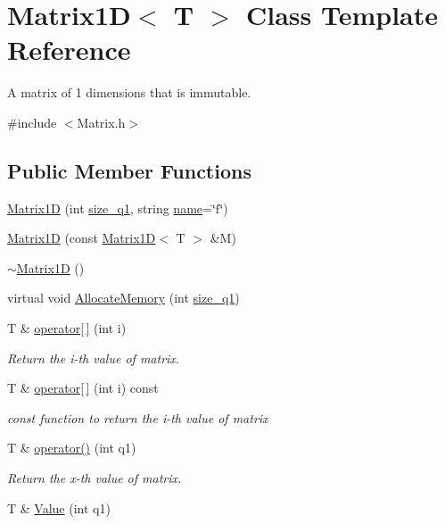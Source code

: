 \hypertarget{class_matrix1_d}{}\section{Matrix1\+D$<$ T $>$ Class Template Reference}
\label{class_matrix1_d}


A matrix of 1 dimensions that is immutable.  




{\ttfamily \#include $<$Matrix.\+h$>$}

\subsection*{Public Member Functions}
\begin{DoxyCompactItemize}
\item 
\hyperlink{class_matrix1_d_ad102d9262ea64711487a931477b166eb}{Matrix1\+D} (int \hyperlink{class_matrix1_d_a570f4a6b7df1811f2c3029ce026a6223}{size\+\_\+q1}, string \hyperlink{class_matrix1_d_a1a5290c958b4bdc9ae76e57c1c7048c2}{name}=\char`\"{}f\char`\"{})
\item 
\hyperlink{class_matrix1_d_a52a3b5b705f0b8bd66c7453436d39903}{Matrix1\+D} (const \hyperlink{class_matrix1_d}{Matrix1\+D}$<$ T $>$ \&M)
\item 
\hyperlink{class_matrix1_d_a7b9b926c9a367272c2815db41489a938}{$\sim$\+Matrix1\+D} ()
\item 
virtual void \hyperlink{class_matrix1_d_a4858f805f2eba8691fc1b2e929f61d3d}{Allocate\+Memory} (int \hyperlink{class_matrix1_d_a570f4a6b7df1811f2c3029ce026a6223}{size\+\_\+q1})
\item 
T \& \hyperlink{class_matrix1_d_ab750d3cce30397703938d1e8a3a40d5e}{operator\mbox{[}$\,$\mbox{]}} (int i)
\begin{DoxyCompactList}\small\item\em Return the i-\/th value of matrix. \end{DoxyCompactList}\item 
T \& \hyperlink{class_matrix1_d_adb3fb9a6de487ad9ede64c57c9612d5e}{operator\mbox{[}$\,$\mbox{]}} (int i) const 
\begin{DoxyCompactList}\small\item\em const function to return the i-\/th value of matrix \end{DoxyCompactList}\item 
T \& \hyperlink{class_matrix1_d_aec42a5a09cc6605c5d91b8c11f4e310e}{operator()} (int q1)
\begin{DoxyCompactList}\small\item\em Return the x-\/th value of matrix. \end{DoxyCompactList}\item 
\hypertarget{class_matrix1_d_a5027f2a1352c1f08ad848aca9e6db27a}{}T \& \hyperlink{class_matrix1_d_a5027f2a1352c1f08ad848aca9e6db27a}{Value} (int q1)\label{class_matrix1_d_a5027f2a1352c1f08ad848aca9e6db27a}


\end{DoxyCompactItemize}
